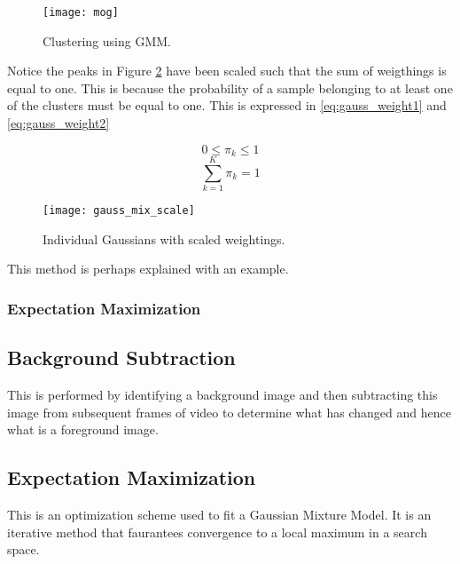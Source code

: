 \begin{figure}[H]
	\centering
	\centering\texttt{[image: mog]}
	\caption{Clustering using GMM.}
	\label{fig:mogcov}
\end{figure}
  
Notice the peaks in Figure \ref{fig:histScale} have been scaled such that the sum of weigthings is equal to one. This is because the probability of a sample belonging to at least one of the clusters must be equal to one. This is expressed in \ref{eq:gauss_weight1} and \ref{eq:gauss_weight2}

\begin{equation}
    0\leq \pi_k \leq 1
\label{eq:gauss_weight1}
\end{equation}
\begin{equation}
    \sum_{k=1}^{K}\pi_k = 1
\label{eq:gauss_weight2}
\end{equation}






\begin{figure}[H]
    \centering
    \centering\texttt{[image: gauss\_mix\_scale]}
    \caption{Individual Gaussians with scaled weightings.}
    \label{fig:histScale}
  \end{figure} 

This method is perhaps explained with an example. 




\subsubsection{Expectation Maximization}






\subsection{Background Subtraction}

This is performed by identifying a background image and then subtracting this image from subsequent frames of video to determine what has changed and hence what is a foreground image.

\subsection{Expectation Maximization}

This is an optimization scheme used to fit a Gaussian Mixture Model. It is an iterative method that faurantees convergence to a local maximum in a search space.